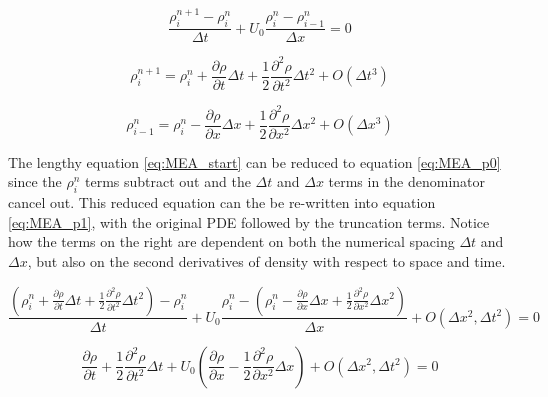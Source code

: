\documentclass{mc2015}
\begin{document}
    \begin{equation}
    	\label{eq:mass_isok_fd}
    	\frac{ \rho_{i}^{n+1} - \rho_{i}^{n} }{\Delta t} 
    	+ U_{0} \frac{\rho_{i}^{n} - \rho_{i-1}^{n}}{\Delta x} = 0
    \end{equation}
    
    \begin{equation}
    	\label{eq:rho_taylor_series_time}
    	\rho_{i}^{n+1} =  \rho_{i}^{n} + 
    	\frac{\partial \rho}{\partial t} \Delta t +
    	\frac{1}{2} \frac{\partial^2 \rho}{\partial t^2} \Delta t^2 + O(\Delta t^{3})
    \end{equation}
    
    \begin{equation}
    	\label{eq:rho_taylor_series_space}
    	\rho_{i-1}^{n} =  \rho_{i}^{n} - 
    	\frac{\partial \rho}{\partial x} \Delta x +
    	\frac{1}{2} \frac{\partial^2 \rho}{\partial x^2} \Delta x^2 + O(\Delta x^{3})
    \end{equation}
    
    The lengthy equation \ref{eq:MEA_start} can be reduced to equation
    \ref{eq:MEA_p0} since the $\rho_{i}^{n}$ terms subtract out and the $\Delta
    t$ and $\Delta x$ terms in the denominator cancel out. This reduced equation
    can the be re-written into equation \ref{eq:MEA_p1}, with the original PDE
    followed by the truncation terms. Notice how the terms on the right are
    dependent on both the numerical spacing $\Delta t$ and $\Delta x$, but also
    on the second derivatives of density with respect to space and time.
    
    \begin{equation}
    	\label{eq:MEA_start}
    	\frac{ \left( \rho_{i}^{n} + \frac{\partial \rho}{\partial t} \Delta t +
    	\frac{1}{2} \frac{\partial^2 \rho}{\partial t^2} \Delta t^2 \right)-\rho_{i}^{n} }{\Delta t} 
    	+ U_{0} \frac{\rho_{i}^{n} - \left( \rho_{i}^{n} -  \frac{\partial \rho}{\partial x} \Delta x + 
    	\frac{1}{2} \frac{\partial^2 \rho}{\partial x^2} \Delta x^2 \right)}{\Delta x} 
    	+ O(\Delta x^{2},\Delta t^{2}) 
    	= 0
    \end{equation}
    
    \begin{equation}
    	\label{eq:MEA_p0}
    	 \frac{\partial \rho}{\partial t}  + \frac{1}{2} \frac{\partial^2 \rho}{\partial t^2} \Delta t +
    	 U_{0} \left(   \frac{\partial \rho}{\partial x}  - \frac{1}{2} \frac{\partial^2 \rho}{\partial x^2} \Delta x \right) 
    	 + O(\Delta x^{2},\Delta t^{2}) 
    	 = 0
    \end{equation}
    
\end{document}
